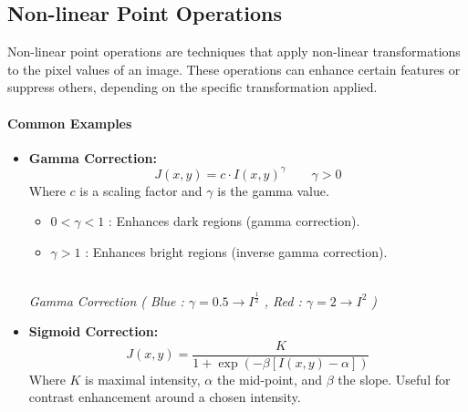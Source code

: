 \subsection{Non-linear Point Operations}
Non-linear point operations are techniques that apply non-linear transformations to the pixel values of an image. These operations can enhance certain features or suppress others, depending on the specific transformation applied.

\paragraph{Common Examples}
\begin{itemize}
    
    \item \textbf{Gamma Correction:}
        $$
        J(x, y) = c \cdot I(x, y)^\gamma \qquad \gamma > 0
        $$
        Where $c$ is a scaling factor and $\gamma$ is the gamma value.
        \begin{itemize}
            \item $0 < \gamma < 1$ : Enhances dark regions (gamma correction).
            \item $\gamma > 1$ : Enhances bright regions (inverse gamma correction).
        \end{itemize}

        \begin{center}
        \\
        \emph{Gamma Correction ( Blue : $\gamma = 0.5 \rightarrow I^{\frac{1}{2}}$  , Red : $\gamma = 2 \rightarrow I^{2}$ )}
        \end{center}

    \item \textbf{Sigmoid Correction:}
        $$
        J(x, y) = \frac{K}{1 + \exp(-\beta [I(x, y) - \alpha])}
        $$
        Where $K$ is maximal intensity, $\alpha$ the mid-point, and $\beta$ the slope. Useful for contrast enhancement around a chosen intensity.


\end{itemize}
